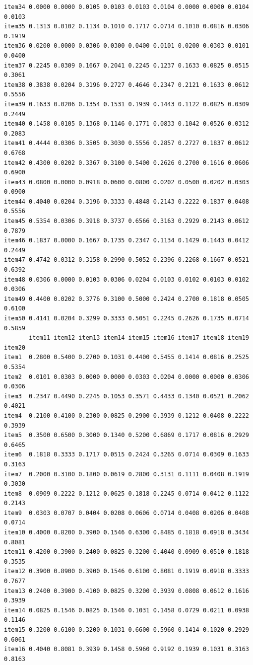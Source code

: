 \documentclass[
  a4paper,
]{ltjsbook}
\begin{document}
\begin{verbatim}
item34 0.0000 0.0000 0.0105 0.0103 0.0103 0.0104 0.0000 0.0000 0.0104 0.0103
item35 0.1313 0.0102 0.1134 0.1010 0.1717 0.0714 0.1010 0.0816 0.0306 0.1919
item36 0.0200 0.0000 0.0306 0.0300 0.0400 0.0101 0.0200 0.0303 0.0101 0.0400
item37 0.2245 0.0309 0.1667 0.2041 0.2245 0.1237 0.1633 0.0825 0.0515 0.3061
item38 0.3838 0.0204 0.3196 0.2727 0.4646 0.2347 0.2121 0.1633 0.0612 0.5556
item39 0.1633 0.0206 0.1354 0.1531 0.1939 0.1443 0.1122 0.0825 0.0309 0.2449
item40 0.1458 0.0105 0.1368 0.1146 0.1771 0.0833 0.1042 0.0526 0.0312 0.2083
item41 0.4444 0.0306 0.3505 0.3030 0.5556 0.2857 0.2727 0.1837 0.0612 0.6768
item42 0.4300 0.0202 0.3367 0.3100 0.5400 0.2626 0.2700 0.1616 0.0606 0.6900
item43 0.0800 0.0000 0.0918 0.0600 0.0800 0.0202 0.0500 0.0202 0.0303 0.0900
item44 0.4040 0.0204 0.3196 0.3333 0.4848 0.2143 0.2222 0.1837 0.0408 0.5556
item45 0.5354 0.0306 0.3918 0.3737 0.6566 0.3163 0.2929 0.2143 0.0612 0.7879
item46 0.1837 0.0000 0.1667 0.1735 0.2347 0.1134 0.1429 0.1443 0.0412 0.2449
item47 0.4742 0.0312 0.3158 0.2990 0.5052 0.2396 0.2268 0.1667 0.0521 0.6392
item48 0.0306 0.0000 0.0103 0.0306 0.0204 0.0103 0.0102 0.0103 0.0102 0.0306
item49 0.4400 0.0202 0.3776 0.3100 0.5000 0.2424 0.2700 0.1818 0.0505 0.6100
item50 0.4141 0.0204 0.3299 0.3333 0.5051 0.2245 0.2626 0.1735 0.0714 0.5859
       item11 item12 item13 item14 item15 item16 item17 item18 item19 item20
item1  0.2800 0.5400 0.2700 0.1031 0.4400 0.5455 0.1414 0.0816 0.2525 0.5354
item2  0.0101 0.0303 0.0000 0.0000 0.0303 0.0204 0.0000 0.0000 0.0306 0.0306
item3  0.2347 0.4490 0.2245 0.1053 0.3571 0.4433 0.1340 0.0521 0.2062 0.4021
item4  0.2100 0.4100 0.2300 0.0825 0.2900 0.3939 0.1212 0.0408 0.2222 0.3939
item5  0.3500 0.6500 0.3000 0.1340 0.5200 0.6869 0.1717 0.0816 0.2929 0.6465
item6  0.1818 0.3333 0.1717 0.0515 0.2424 0.3265 0.0714 0.0309 0.1633 0.3163
item7  0.2000 0.3100 0.1800 0.0619 0.2800 0.3131 0.1111 0.0408 0.1919 0.3030
item8  0.0909 0.2222 0.1212 0.0625 0.1818 0.2245 0.0714 0.0412 0.1122 0.2143
item9  0.0303 0.0707 0.0404 0.0208 0.0606 0.0714 0.0408 0.0206 0.0408 0.0714
item10 0.4000 0.8200 0.3900 0.1546 0.6300 0.8485 0.1818 0.0918 0.3434 0.8081
item11 0.4200 0.3900 0.2400 0.0825 0.3200 0.4040 0.0909 0.0510 0.1818 0.3535
item12 0.3900 0.8900 0.3900 0.1546 0.6100 0.8081 0.1919 0.0918 0.3333 0.7677
item13 0.2400 0.3900 0.4100 0.0825 0.3200 0.3939 0.0808 0.0612 0.1616 0.3939
item14 0.0825 0.1546 0.0825 0.1546 0.1031 0.1458 0.0729 0.0211 0.0938 0.1146
item15 0.3200 0.6100 0.3200 0.1031 0.6600 0.5960 0.1414 0.1020 0.2929 0.6061
item16 0.4040 0.8081 0.3939 0.1458 0.5960 0.9192 0.1939 0.1031 0.3163 0.8163

\end{verbatim}
\end{document}
